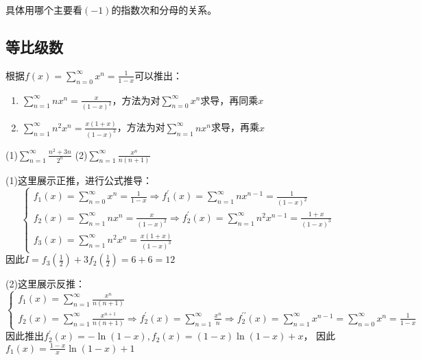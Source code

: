 \begin{note}
  具体用哪个主要看$(-1)$的指数次和分母的关系。
\end{note}

\subsection{等比级数}

\begin{theorem}[等比级数]
  根据$f(x) = \sum\limits_{n = 0}^{\infty} x^n = \frac{1}{1-x}$可以推出：
  \begin{enumerate}
  \item $\sum\limits_{n = 1}^{\infty} nx^n = \frac{x}{(1 - x)^2}$，方法为对$\sum\limits_{n = 0}^{\infty}x^n$求导，再同乘$x$
  \item $\sum\limits_{n = 1}^{\infty} n^2x^n = \frac{x(1+x)}{(1-x)^3}$，方法为对$\sum\limits_{n = 1}^{\infty}nx^n$求导，再乘$x$
  \end{enumerate}
\end{theorem}


\begin{exercise}[等比级数]
  (1)$\sum\limits_{n = 1}^{\infty} \frac{n^2 + 3n}{2^n}$
  (2)$\sum\limits_{n = 1}^{\infty} \frac{x^n}{n(n+1)}$
\end{exercise}

\begin{solution}
  (1)这里展示正推，进行公式推导：
  \begin{equation*}
    \begin{cases}
      f_1(x) = \sum\limits_{n = 0}^{\infty} x^n = \frac{1}{1-x} \Rightarrow f^{\prime}_1(x) = \sum\limits_{n = 1}^{\infty} nx^{n-1} = \frac{1}{(1-x)^2}\\
      f_2(x) = \sum\limits_{n = 1}^{\infty} nx^n = \frac{x}{(1-x)^2} \Rightarrow f_2^{\prime}(x) = \sum\limits_{n = 1}^{\infty} n^2x^{n-1} = \frac{1+x}{(1 - x)^3}\\
      f_3(x) = \sum\limits_{n = 1}^{\infty} n^2x^n = \frac{x(1 + x)}{(1 - x)^3}
    \end{cases}
  \end{equation*}
  因此$I = f_3(\frac{1}{2}) + 3 f_2(\frac{1}{2}) = 6 + 6 = 12$

  (2)这里展示反推：
  \begin{equation*}
    \begin{cases}
      f_1(x) = \sum\limits_{n = 1}^{\infty} \frac{x^n}{n(n+1)}\\
      f_2(x) = \sum\limits_{n = 1}^{\infty} \frac{x^{n+1}}{n(n+1)} \Rightarrow f^{\prime}_2(x) = \sum\limits_{n = 1}^{\infty} \frac{x^n}{n} \Rightarrow f_2^{\prime\prime}(x) = \sum\limits_{n = 1}^{\infty}x^{n-1} = \sum\limits_{n = 0}^{\infty} x^n = \frac{1}{1-x}
    \end{cases}
  \end{equation*}
  因此推出$f_2^{\prime}(x) = - \ln(1 - x), f_2(x) = (1-x)\ln(1-x) + x$，
  因此$f_1(x) = \frac{1-x}{x}\ln(1-x) + 1$
\end{solution}



